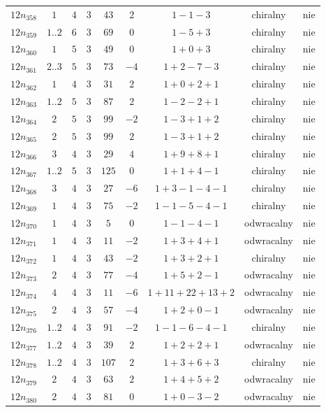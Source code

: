 \begin{longtable}{ccccccccc}
$12n_{358}$ & $1$ & $4$ & $3$ & $43$ & $2$ & $1-1-3$ & chiralny & nie \\
$12n_{359}$ & $1..2$ & $6$ & $3$ & $69$ & $0$ & $1-5+3$ & chiralny & nie \\
$12n_{360}$ & $1$ & $5$ & $3$ & $49$ & $0$ & $1+0+3$ & chiralny & nie \\
$12n_{361}$ & $2..3$ & $5$ & $3$ & $73$ & $-4$ & $1+2-7-3$ & chiralny & nie \\
$12n_{362}$ & $1$ & $4$ & $3$ & $31$ & $2$ & $1+0+2+1$ & chiralny & nie \\
$12n_{363}$ & $1..2$ & $5$ & $3$ & $87$ & $2$ & $1-2-2+1$ & chiralny & nie \\
$12n_{364}$ & $2$ & $5$ & $3$ & $99$ & $-2$ & $1-3+1+2$ & chiralny & nie \\
$12n_{365}$ & $2$ & $5$ & $3$ & $99$ & $2$ & $1-3+1+2$ & chiralny & nie \\
$12n_{366}$ & $3$ & $4$ & $3$ & $29$ & $4$ & $1+9+8+1$ & chiralny & nie \\
$12n_{367}$ & $1..2$ & $5$ & $3$ & $125$ & $0$ & $1+1+4-1$ & chiralny & nie \\
$12n_{368}$ & $3$ & $4$ & $3$ & $27$ & $-6$ & $1+3-1-4-1$ & chiralny & nie \\
$12n_{369}$ & $1$ & $4$ & $3$ & $75$ & $-2$ & $1-1-5-4-1$ & chiralny & nie \\
$12n_{370}$ & $1$ & $4$ & $3$ & $5$ & $0$ & $1-1-4-1$ & odwracalny & nie \\
$12n_{371}$ & $1$ & $4$ & $3$ & $11$ & $-2$ & $1+3+4+1$ & odwracalny & nie \\
$12n_{372}$ & $1$ & $4$ & $3$ & $43$ & $-2$ & $1+3+2+1$ & chiralny & nie \\
$12n_{373}$ & $2$ & $4$ & $3$ & $77$ & $-4$ & $1+5+2-1$ & odwracalny & nie \\
$12n_{374}$ & $4$ & $4$ & $3$ & $11$ & $-6$ & $1+11+22+13+2$ & odwracalny & nie \\
$12n_{375}$ & $2$ & $4$ & $3$ & $57$ & $-4$ & $1+2+0-1$ & odwracalny & nie \\
$12n_{376}$ & $1..2$ & $4$ & $3$ & $91$ & $-2$ & $1-1-6-4-1$ & chiralny & nie \\
$12n_{377}$ & $1..2$ & $4$ & $3$ & $39$ & $2$ & $1+2+2+1$ & odwracalny & nie \\
$12n_{378}$ & $1..2$ & $4$ & $3$ & $107$ & $2$ & $1+3+6+3$ & chiralny & nie \\
$12n_{379}$ & $2$ & $4$ & $3$ & $63$ & $2$ & $1+4+5+2$ & odwracalny & nie \\
$12n_{380}$ & $2$ & $4$ & $3$ & $81$ & $0$ & $1+0-3-2$ & odwracalny & nie \\

\end{longtable}
